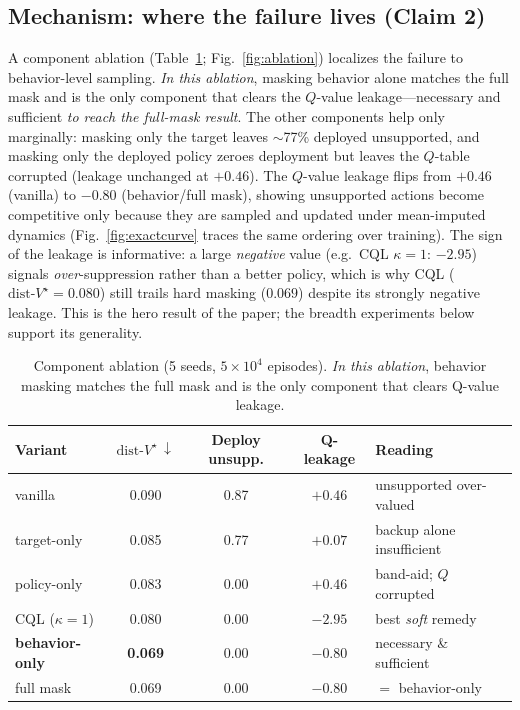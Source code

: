 \documentclass{article}
\newcommand{\dist}{\mathrm{dist}\text{-}V^\star}
\begin{document}
\subsection{Mechanism: where the failure lives (Claim 2)}
\label{sec:mechanism}
A component ablation (Table~\ref{tab:ablation}; Fig.~\ref{fig:ablation}) localizes
the failure to behavior-level sampling. \emph{In this ablation}, masking behavior
alone matches the full mask and is the only component that clears the $Q$-value
leakage---necessary and sufficient \emph{to reach the full-mask result}. The other
components help only marginally: masking only the target leaves $\sim$77\% deployed
unsupported, and masking only the deployed policy zeroes deployment but leaves the
$Q$-table corrupted (leakage unchanged at $+0.46$). The $Q$-value leakage flips from $+0.46$ (vanilla) to
$-0.80$ (behavior/full mask), showing unsupported actions become competitive only
because they are sampled and updated under mean-imputed dynamics (Fig.~\ref{fig:exactcurve}
traces the same ordering over training). The sign of the
leakage is informative: a large \emph{negative} value (e.g.\ CQL $\kappa{=}1$:
$-2.95$) signals \emph{over}-suppression rather than a better policy, which is why
CQL ($\dist{=}0.080$) still trails hard masking ($0.069$) despite its strongly
negative leakage. This is the hero result of the paper; the breadth experiments
below support its generality.

\begin{table}[t]
\centering
\caption{Component ablation (5 seeds, $5{\times}10^4$ episodes). \emph{In this
ablation}, behavior masking matches the full mask and is the only component that clears Q-value leakage.}
\label{tab:ablation}
\begin{tabular}{lcccl}
\toprule
Variant & $\dist\,\downarrow$ & Deploy unsupp. & Q-leakage & Reading \\
\midrule
vanilla            & 0.090 & 0.87 & $+0.46$ & unsupported over-valued \\
target-only        & 0.085 & 0.77 & $+0.07$ & backup alone insufficient \\
policy-only        & 0.083 & 0.00 & $+0.46$ & band-aid; $Q$ corrupted \\
CQL ($\kappa{=}1$) & 0.080 & 0.00 & $-2.95$ & best \emph{soft} remedy \\
\textbf{behavior-only} & \textbf{0.069} & 0.00 & $-0.80$ & necessary \& sufficient \\
full mask          & 0.069 & 0.00 & $-0.80$ & $=$ behavior-only \\
\bottomrule
\end{tabular}
\end{table}
\end{document}
